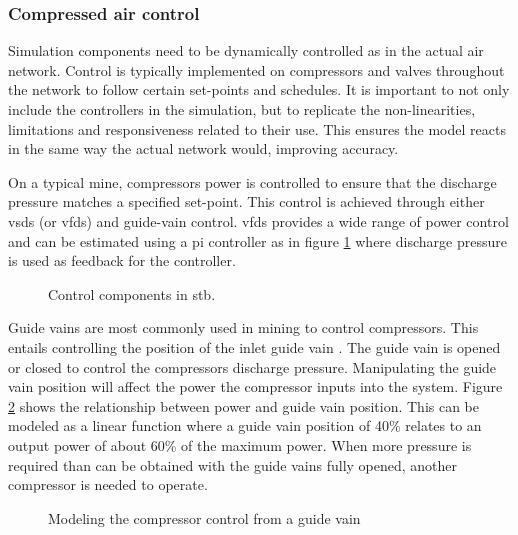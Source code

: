 		\subsubsection{Compressed air control}\label{Controllers}
			Simulation components need to be dynamically controlled as in the actual air network. Control is typically implemented on compressors and valves throughout the network to follow certain set-points and schedules. It is important to not only include the controllers in the simulation, but to replicate the non-linearities, limitations and responsiveness related to their use. This ensures the model reacts in the same way the actual network would, improving accuracy.
			\par 
			On a typical mine, compressors power is controlled to ensure that the discharge pressure matches a specified set-point. This control is achieved through either \glspl{vsd} (or \glspl{vfd}) and guide-vain control. \glspl{vfd} provides a wide range of power control and can be estimated using a \gls{pi} controller as in figure \ref{fig: Controller models} where discharge pressure is used as feedback for the controller. 
	\begin{figure}[h]
		\centering
		\caption{Control components in \gls{stb}.}
		\label{fig: Controller models}
	\end{figure}
		Guide vains are most commonly used in mining to control compressors. This entails controlling the position of the inlet guide vain . The guide vain is opened or closed to control the compressors discharge pressure.  Manipulating the guide vain position will affect the power the compressor inputs into the system. Figure \ref{fig: Guide vain position} shows the relationship between  power and guide vain position. This can be modeled as a linear function where a guide vain position of 40\% relates to an output power of about 60\% of the maximum power. When more pressure is required than can be obtained with the guide vains fully opened, another compressor is needed to operate. 
		\begin{figure}[h]
			\centering
			\fbox{}
			\caption{Modeling the compressor control from a guide vain}
			\label{fig: Guide vain position}
		\end{figure}
